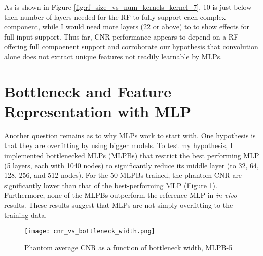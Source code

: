 As is shown in Figure \ref{fig:rf_size_vs_num_kernels_kernel_7}, 10 is just below then number of layers needed for the RF to fully support each complex component, while I would need more layers (22 or above) to to show effects for full input support. Thus far, CNR performance appears to depend on a RF offering full compoenent support and corroborate our hypothesis that convolution alone does not extract unique features not readily learnable by MLPs.


\section{Bottleneck and Feature Representation with MLP}
Another question remains as to why MLPs work to start with. One hypothesis is that they are overfitting by using bigger models. To test my hypothesis, I implemented bottlenecked MLPs (MLPBs) that restrict the best performing MLP (5 layers, each with 1040 nodes) to significantly reduce its middle layer (to 32, 64, 128, 256, and 512 nodes). For the 50 MLPBs trained, the phantom CNR are significantly lower than that of the best-performing MLP (Figure \ref{fig:cnr_vs_bottleneck_width}). Furthermore, none of the MLPBs outperform the reference MLP in \textit{in vivo} results. These results suggest that MLPs are not simply overfitting to the training data.
\begin{figure}[htbp]
  \centerline{\texttt{[image: cnr\_vs\_bottleneck\_width.png]}}
  \caption{Phantom average CNR as a function of bottleneck width, MLPB-5}
  \label{fig:cnr_vs_bottleneck_width}
\end{figure}

